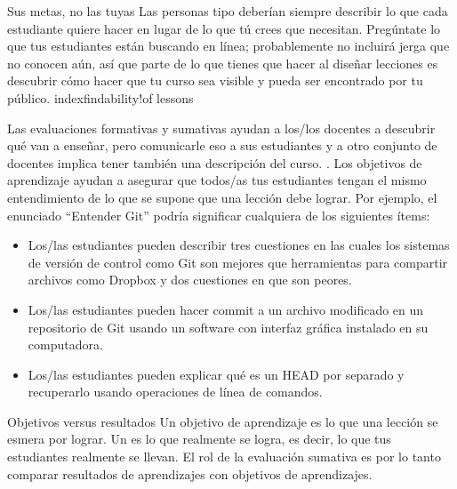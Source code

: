\begin{aside}{Sus metas, no las tuyas}
Las personas tipo deberían siempre describir lo que cada estudiante quiere hacer
en lugar de lo que tú crees que necesitan.
Pregúntate lo que tus estudiantes están buscando en línea;
probablemente no incluirá jerga que no conocen aún,
así que parte de lo que tienes que hacer al diseñar lecciones es
descubrir cómo hacer que tu curso sea visible y pueda ser encontrado por tu público. index{findability!of lessons}
\end{aside}


 
Las evaluaciones formativas y sumativas ayudan a los/los docentes a descubrir qué van a enseñar,
pero comunicarle eso a sus estudiantes y a otro conjunto de docentes
implica tener también una descripción del curso.
.
Los objetivos de aprendizaje ayudan a asegurar que
todos/as tus estudiantes tengan el mismo entendimiento de lo que se supone que una lección debe lograr.
Por ejemplo,
el enunciado ``Entender Git'' podría significar cualquiera de los siguientes ítems:
 
\begin{itemize}
 
\item
  Los/las estudiantes pueden describir tres cuestiones
  en las cuales los sistemas de versión de control como Git son mejores que herramientas para compartir archivos como Dropbox
  y dos cuestiones en que son peores.
 
\item
Los/las estudiantes pueden hacer commit a un archivo modificado en un repositorio de Git
usando un software con interfaz gráfica instalado en su computadora.
 
\item
  Los/las estudiantes pueden explicar qué es un HEAD por separado
 y recuperarlo usando operaciones de línea de comandos.
 
\end{itemize}
 

\begin{aside}{Objetivos versus resultados}
 Un objetivo de aprendizaje es lo que una lección se esmera por lograr.
 Un  es lo que realmente se logra,
 es decir, lo que tus estudiantes realmente se llevan.
El rol de la evaluación sumativa es por lo tanto
comparar resultados de aprendizajes con objetivos de aprendizajes.
\end{aside}
 
